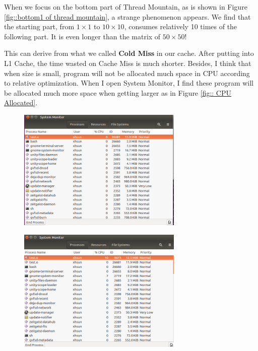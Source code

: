 \documentclass[12pt,a4paper]{article}
\begin{document}
When we focus on the bottom part of Thread Mountain, as is shown in Figure \ref{fig::bottom1 of thread mountain}, a strange phenomenon appears. We find that the starting part, from $1\times1$ to $10 \times 10$, consumes relatively 10 times of the following part. It is even longer than the matrix of $50\times 50$!

This can derive from what we called \textbf{Cold Miss} in our cache. After putting into L1 Cache, the time wasted on Cache Miss is much shorter. Besides, I think that when size is small, program will not be allocated much space in CPU according to relative optimization. When I open System Monitor, I find these program will be allocated much more space when getting larger as in Figure \ref{fig:: CPU Allocated}.


\begin{minipage}{0.4\textwidth}
	\begin{figure}[H]
		\centering
		\includegraphics[width=0.7\textwidth]{./fig/Screenshot_0.png}
	\end{figure}
\end{minipage}
\begin{minipage}{0.4\textwidth}
	\begin{figure}[H]
		\centering
		\includegraphics[width=0.7\textwidth]{./fig/Screenshot_10.png}
	\end{figure}
\end{minipage}
\end{document}

